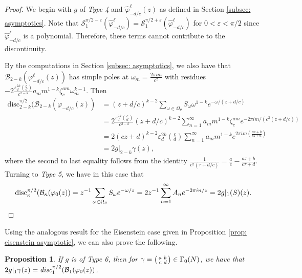 \documentclass[12pt]{amsart}
\theoremstyle{definition}
\theoremstyle{plain}
\newtheorem{prop}[theorem]{Proposition}
\numberwithin{equation}{section}
\begin{document}
\begin{proof}
We begin with $g$ of \emph{Type 4} and $\widehat{\varphi}_{-d/c}^{\ell}(z)$ as defined in 
Section \ref{subsec: asymptotics}. Note that $\mathcal{S}_1^{\pi/2 - \varepsilon}(\widehat{\varphi}_{-d/c}^{\ell})=\mathcal{S}_1^{\pi/2 + \varepsilon}(\widehat{\varphi}_{-d/c}^{\ell})$ for $0< \varepsilon< \pi/2$ since $\widehat{\varphi}_{-d/c}^{\ell}$ is a polynomial. Therefore, these terms cannot contribute to the discontinuity. 

By the computations in Section \ref{subsec: asymptotics}, we also have that $\mathcal{B}_{2-k}(\varphi^\ell_{-d/c}(z))$ has simple poles at $\omega_m = \frac{2\pi i m}{c^2}$ with residues $-2 \frac{\varepsilon_d^{2k} \left( \frac{c}{d}\right)}{c^{2-k}}  a_m m^{1-k}\zeta_c^{am}\omega_m^{k-1}$.
Then
\begin{align*}\text{disc}_{2-k}^{\pi/2}(\mathcal{B}_{2-k}(\varphi_{-d/c}(z)) &= (z+d/c)^{k-2}\sum_{\omega \in \Omega_\theta} S_\omega \omega^{1-k} e^{-\omega/(z+d/c)}\\
	&= 2 \frac{\varepsilon_d^{2k} \left( \frac{c}{d}\right)}{c^{2-k}} (z+d/c)^{k-2}\sum_{n =1}^\infty    a_m m^{1-k}\zeta_c^{am} e^{-2\pi i m/(c^2(z+d/c))}\\
	&= 2(cz+d)^{k-2}\varepsilon_d^{2k} \left( \frac{c}{d}\right)\sum_{n =1}^\infty    a_m m^{1-k} e^{2\pi i m\left(\frac{az+b}{cz+d}\right)} \\
	&= 2g|_{2-k}\gamma(z),
\end{align*}
where the second to last equality follows from the identity  $\frac{1}{c^2(\tau+d/c)} = \frac{a}{c} - \frac{a\tau+ b}{c\tau +d}$.
Turning to \emph{Type 5}, we have in this case that
\[\text{disc}_\kappa^{\pi/2}(\mathcal{B}_\kappa(\varphi_{0}(z)) = z^{-1}\sum_{\omega \in \Omega_\theta} S_\omega e^{-\omega/z} =2 z^{-1} \sum_{n=1}^\infty 	A_n e^{-2\pi i n/z} = 2g|_{1}(S)(z). \qedhere
\] 
\end{proof}

Using the analogous result for the Eisenstein case given in Proposition \ref{prop: eisenstein asymptotic}, we can also prove the following. 
\begin{prop}
	If $g$ is of Type 6, then  for $\gamma = \begin{psmallmatrix} a & b \\ c & d \end{psmallmatrix} \in \Gamma_0(N)$, we have that 
 $2g|_{1}\gamma(z) = \emph{disc}_1^{\pi/2}(\mathcal{B}_1(\varphi_{0}(z))$.
\end{prop}
\end{document}
